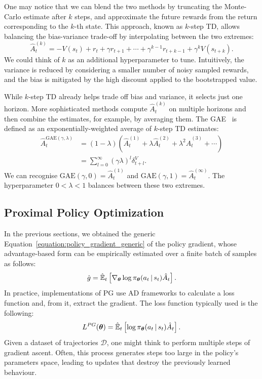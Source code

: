 One may notice that we can blend the two methods by truncating the Monte-Carlo estimate after $k$ steps, and approximate the future rewards from the return corresponding to the $k$-th state.
This approach, known as $k$-step TD, allows balancing the bias-variance trade-off by interpolating between the two extremes:
%
\begin{equation*}
    \hat{A}_t^{(k)} = -V(s_t) + r_t + \gamma r_{t+1} + \cdots + \gamma^{k-1} r_{t+k-1} + \gamma^k V(s_{t+k}) .
\end{equation*}
%
We could think of $k$ as an additional hyperparameter to tune.
Intuitively, the variance is reduced by considering a smaller number of noisy sampled rewards, and the bias is mitigated by the high discount applied to the bootstrapped value.

While $k$-step TD already helps trade off bias and variance, it selects just one horizon.
More sophisticated methods compute $\hat{A}_t^{(k)}$ on multiple horizons and then combine the estimates, for example, by averaging them.
The \ac{GAE}~\parencite{schulman_high-dimensional_2018} is defined as an exponentially-weighted average of $k$-step TD estimates:
%
\begin{align*}
    \hat{A}_t^{\text{GAE}(\gamma, \lambda)} 
    &= (1 - \lambda) \left( \hat{A}_t^{(1)} + \lambda \hat{A}_t^{(2)} + \lambda^2 \hat{A}_t^{(3)} + \cdots \right) \\
    &= \sum_{l=0}^{\infty} (\gamma \lambda)^l \delta^V_{t+l}
    .
\end{align*}
%
We can recognise $\text{GAE}(\gamma, 0) = \hat{A}_t^{(1)}$ and $\text{GAE}(\gamma, 1) = \hat{A}_t^{(\infty)}$.
The hyperparameter $0 < \lambda < 1$ balances between these two extremes.

\subsection{Proximal Policy Optimization}
\label{sec:ppo}

In the previous sections, we obtained the generic Equation~\eqref{equation:policy_gradient_generic} of the policy gradient, whose advantage-based form can be empirically estimated over a finite batch of samples as follows:
%
\begin{equation*}
    \hat{g} = \hat{\operatorname*{\mathbb{E}}}_t \left[ \nabla_{\boldsymbol{\theta}} \log \pi_{\boldsymbol{\theta}}(a_t \operatorname{\mid} s_t) \hat{A}_t \right] .
\end{equation*}
%
In practice, implementations of \ac{PG} use \acl{AD} frameworks to calculate a loss function and, from it, extract the gradient.
The loss function typically used is the following:
%
\begin{equation}
    \label{equation:policy_gradient_loss_advantage}
    L^{PG}(\boldsymbol{\theta}) = \hat{\operatorname*{\mathbb{E}}}_t \left[ \log \pi_{\boldsymbol{\theta}}(a_t \operatorname{\mid} s_t) \hat{A}_t \right] .
\end{equation}
%
Given a dataset of trajectories $\mathcal{D}$, one might think to perform multiple steps of gradient ascent.
Often, this process generates steps too large in the policy's parameters space, leading to updates that destroy the previously learned behaviour.

